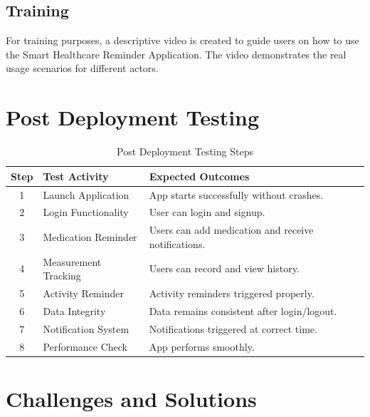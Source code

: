 \subsection{Training}
For training purposes, a descriptive video is created to guide users on how to use the Smart Healthcare Reminder Application. The video demonstrates the real usage scenarios for different actors.

\section{Post Deployment Testing}

\begin{table}[H]
\centering
\caption{Post Deployment Testing Steps}
\begin{tabularx}{\textwidth}{|c|l|X|}
\hline
\textbf{Step} & \textbf{Test Activity} & \textbf{Expected Outcomes} \\ \hline
1 & Launch Application & App starts successfully without crashes. \\ \hline
2 & Login Functionality & User can login and signup. \\ \hline
3 & Medication Reminder & Users can add medication and receive notifications. \\ \hline
4 & Measurement Tracking & Users can record and view history. \\ \hline
5 & Activity Reminder & Activity reminders triggered properly. \\ \hline
6 & Data Integrity & Data remains consistent after login/logout. \\ \hline
7 & Notification System & Notifications triggered at correct time. \\ \hline
8 & Performance Check & App performs smoothly. \\ \hline
\end{tabularx}
\end{table}

\section{Challenges and Solutions}

